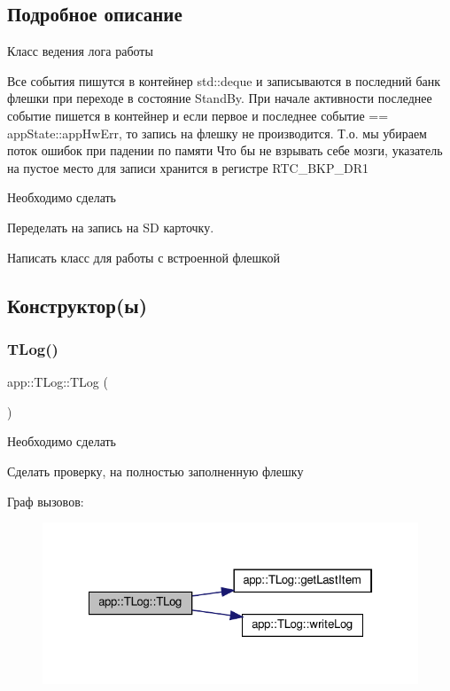 \subsection{Подробное описание}
Класс ведения лога работы 

Все события пишутся в контейнер std\+::deque и записываются в последний банк флешки при переходе в состояние Stand\+By. При начале активности последнее событие пишется в контейнер и если первое и последнее событие == app\+State\+::app\+Hw\+Err, то запись на флешку не производится. Т.\+о. мы убираем поток ошибок при падении по памяти Что бы не взрывать себе мозги, указатель на пустое место для записи хранится в регистре R\+T\+C\+\_\+\+B\+K\+P\+\_\+\+D\+R1 \begin{DoxyRefDesc}{Необходимо сделать}
\item[\hyperlink{todo__todo000010}{Необходимо сделать}]Переделать на запись на SD карточку. 

Написать класс для работы с встроенной флешкой \end{DoxyRefDesc}


\subsection{Конструктор(ы)}
\mbox{\label{classapp_1_1_t_log_a9f8a10a82504933ab909b90ea9413b65}} 
\subsubsection{\texorpdfstring{T\+Log()}{TLog()}}
{\footnotesize\ttfamily app\+::\+T\+Log\+::\+T\+Log (\begin{DoxyParamCaption}{ }\end{DoxyParamCaption})}



 \begin{DoxyRefDesc}{Необходимо сделать}
\item[\hyperlink{todo__todo000009}{Необходимо сделать}]Сделать проверку, на полностью заполненную флешку \end{DoxyRefDesc}
Граф вызовов\+:\nopagebreak
\begin{figure}[H]
\begin{center}
\leavevmode
\includegraphics[width=322pt]{classapp_1_1_t_log_a9f8a10a82504933ab909b90ea9413b65_cgraph}
\end{center}
\end{figure}


